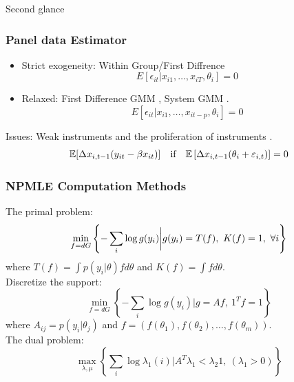 \documentclass[10pt,mathserif,aspectratio=169]{beamer}
\begin{document}
\begin{frame}[label=reg_sep]{Second glance}
  \begin{table}
    \fontsize{6pt}{6pt}\selectfont
    
  \end{table}
  \hyperlink{output}{}
\end{frame}

\begin{frame}
  \frametitle{Panel data Estimator}
  \begin{itemize}\itemsep=12pt
    \item Strict exogeneity: Within Group/First Diffrence
          \begin{equation*}
            E[\epsilon_{it}|x_{i1},\ldots, x_{iT},\theta_i]=0
          \end{equation*}
    \item Relaxed: First Difference GMM \citep{arellano1991some}, System GMM
          \citep{arellano1995another,blundell1998initial}.
          \begin{equation*}
            E[\epsilon_{it}|x_{i1},\ldots, x_{it-p},\theta_i]=0
          \end{equation*}
  \end{itemize}

  Issues: Weak instruments \citep{blundell_bond_1998} and the proliferation of
  instruments \citep{roodman2007short}.
  \begin{equation*}
    \mathbb{E}[\Delta x_{i,t-1}(y_{it}-\beta x_{it})] \quad \text{if}\quad \mathbb{E}\left[\Delta x_{i,t-1}(\theta_i+\varepsilon_{i,t})\right]=0
  \end{equation*}
\end{frame}

\begin{frame}
  \frametitle{NPMLE Computation Methods}

  The primal problem:
  \begin{equation*}
    \min_{f=dG}\left\{-\sum_i \log g(y_i)\bigg |g(y_i) = T(f),\ K(f)=1,\ \forall i \right\}
  \end{equation*}
  where $ T(f)=\int p(y_i |\theta)fd\theta $ and  $K(f)= \int f d\theta$.\\
  Discretize the support:
  \begin{equation*}
    \min_{f=dG}\left\{-\sum_i \log g(y_i)\bigg |g=Af,\ {1^T}f=1\right\}
  \end{equation*}
  where $A_{ij}= p(y_i|\theta_j) $ and $ f = (f(\theta_1),f(\theta_2),\ldots,f(\theta_m))$.\\
  The dual problem:
  \begin{equation*}
    \max_{\lambda,\mu} \left\{ \sum_i \log \lambda_1(i) \bigg| A^T\lambda_1 < \lambda_2 1,\ (\lambda_1>0) \right\}
  \end{equation*}
\end{frame}
\end{document}
